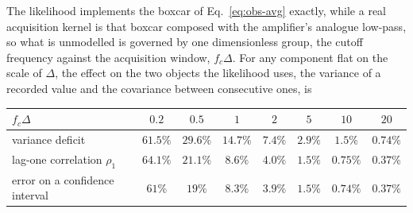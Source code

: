 \begin{appendixbox}
The likelihood implements the boxcar of Eq.~\ref{eq:obs-avg} exactly, while a real acquisition
kernel is that boxcar composed with the amplifier's analogue low-pass, so what is unmodelled is
governed by one dimensionless group, the cutoff frequency against the acquisition window,
$f_c\Delta$. For any component flat on the scale of $\Delta$, the effect on the two objects the
likelihood uses, the variance of a recorded value and the covariance between consecutive ones, is

\begin{center}
\begin{tabular}{@{}lccccccc@{}}
\toprule
$f_c\Delta$ & $0.2$ & $0.5$ & $1$ & $2$ & $5$ & $10$ & $20$ \\
\midrule
variance deficit & $61.5\%$ & $29.6\%$ & $14.7\%$ & $7.4\%$ & $2.9\%$ & $1.5\%$ & $0.74\%$ \\
lag-one correlation $\rho_1$ & $64.1\%$ & $21.1\%$ & $8.6\%$ & $4.0\%$ & $1.5\%$ & $0.75\%$ & $0.37\%$ \\
error on a confidence interval & $61\%$ & $19\%$ & $8.3\%$ & $3.9\%$ & $1.5\%$ & $0.74\%$ & $0.37\%$ \\
\bottomrule
\end{tabular}
\end{center}


\end{appendixbox}
